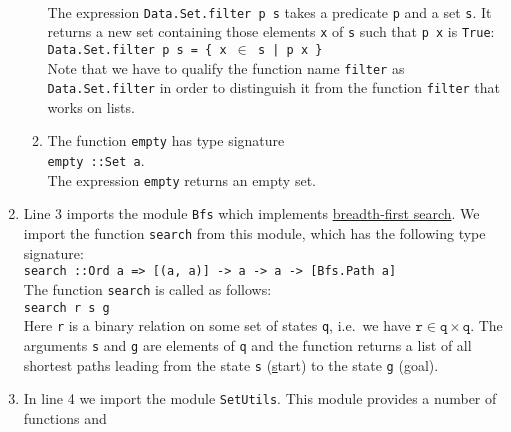 \begin{enumerate}
\begin{enumerate}
            \\[0.2cm]
            The expression \texttt{Data.Set.filter p s} takes a predicate \texttt{p} and a set \texttt{s}.
            It returns a new set containing those elements \texttt{x} of \texttt{s} such that \texttt{p x} is
            \texttt{True}:
            \\[0.2cm]
            \hspace*{1.3cm}
            \texttt{Data.Set.filter p s = \{ x $\in$ s | p x \}}
            \\[0.2cm]
            Note that we have to qualify the function name \texttt{filter} as \texttt{Data.Set.filter} in order
            to distinguish it from the function \texttt{filter} that works on lists.
      \item The function \texttt{empty} has type signature
            \\[0.2cm]
            \hspace*{1.3cm}
            \texttt{empty ::\;Set a}.
            \\[0.2cm]
            The expression \texttt{empty} returns an empty set.
      \end{enumerate}
      \item Line 3 imports the module \texttt{Bfs} which implements
            \href{https://en.wikipedia.org/wiki/Breadth-first_search}{breadth-first search}.  We import the
            function \texttt{search} from this module, which has the following type signature:
            \\[0.2cm]
            \hspace*{1.3cm}
            \texttt{search ::\;Ord a => [(a, a)] -> a -> a -> [Bfs.Path a]}
            \\[0.2cm]
            The function \texttt{search} is called as follows:
            \\[0.2cm]
            \hspace*{1.3cm}
            \texttt{search r s g}
            \\[0.2cm]
            Here \texttt{r} is a binary relation on some set of states \texttt{q}, i.e.~we have
            $\texttt{r} \in \texttt{q} \times \texttt{q}$. The arguments \texttt{s} and \texttt{g} are elements
            of \texttt{q} and the function returns a list of all shortest paths leading from the state
            \texttt{s} (\underline{s}tart) to the state \texttt{g} (\underline{g}oal).
      \item In line 4 we import the module \texttt{SetUtils}.  This module provides a number of functions and

\end{enumerate}
